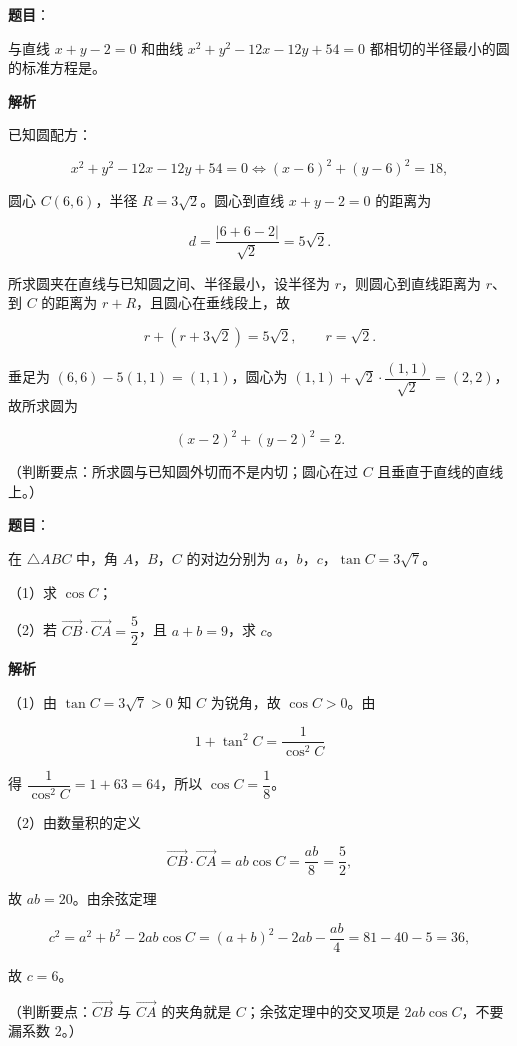 \begin{answer}

\textbf{题目}：

与直线 $x+y-2=0$ 和曲线 $x^2+y^2-12x-12y+54=0$ 都相切的半径最小的圆的标准方程是\gkblank{}。

\textbf{解析}

已知圆配方：

\nopagebreak[4]
\[x^2+y^2-12x-12y+54=0\iff(x-6)^2+(y-6)^2=18,\]

圆心 $C(6,6)$，半径 $R=3\sqrt2$。圆心到直线 $x+y-2=0$ 的距离为

\nopagebreak[4]
\[d=\frac{|6+6-2|}{\sqrt2}=5\sqrt2.\]

所求圆夹在直线与已知圆之间、半径最小，设半径为 $r$，则圆心到直线距离为 $r$、到 $C$ 的距离为 $r+R$，且圆心在垂线段上，故

\nopagebreak[4]
\[r+(r+3\sqrt2)=5\sqrt2,\qquad r=\sqrt2.\]

垂足为 $(6,6)-5(1,1)=(1,1)$，圆心为 $(1,1)+\sqrt2\cdot\dfrac{(1,1)}{\sqrt2}=(2,2)$，故所求圆为

\nopagebreak[4]
\[(x-2)^2+(y-2)^2=2.\]

（判断要点：所求圆与已知圆外切而不是内切；圆心在过 $C$ 且垂直于直线的直线上。）


\end{answer}
\begin{answer}

\textbf{题目}：

在 $\triangle ABC$ 中，角 $A$，$B$，$C$ 的对边分别为 $a$，$b$，$c$，$\tan C=3\sqrt7$。

（1）求 $\cos C$；

（2）若 $\overrightarrow{CB}\cdot\overrightarrow{CA}=\dfrac52$，且 $a+b=9$，求 $c$。

\textbf{解析}

（1）由 $\tan C=3\sqrt7>0$ 知 $C$ 为锐角，故 $\cos C>0$。由

\nopagebreak[4]
\[1+\tan^2C=\frac{1}{\cos^2C}\]

得 $\dfrac{1}{\cos^2C}=1+63=64$，所以 $\cos C=\dfrac18$。

（2）由数量积的定义

\nopagebreak[4]
\[\overrightarrow{CB}\cdot\overrightarrow{CA}=ab\cos C=\frac{ab}{8}=\frac52,\]

故 $ab=20$。由余弦定理

\nopagebreak[4]
\[c^2=a^2+b^2-2ab\cos C=(a+b)^2-2ab-\frac{ab}{4}=81-40-5=36,\]

故 $c=6$。

（判断要点：$\overrightarrow{CB}$ 与 $\overrightarrow{CA}$ 的夹角就是 $C$；余弦定理中的交叉项是 $2ab\cos C$，不要漏系数 $2$。）


\end{answer}
